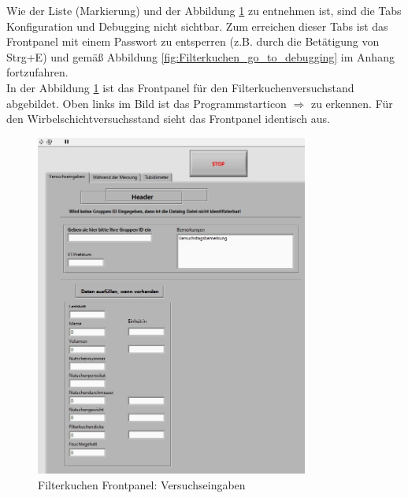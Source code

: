 Wie der Liste (\textcolor{black!50}{Markierung}) und der Abbildung \ref{fig:FilterkuchenVersuchseingaben} zu entnehmen ist, sind die Tabs \textcolor{black!50}{Konfiguration} und \textcolor{black!50}{Debugging} nicht sichtbar. Zum erreichen dieser Tabs ist das Frontpanel mit einem Passwort zu entsperren (z.B. durch die Betätigung von \,{\Menlo Strg+E}) und gemäß Abbildung \ref{fig:Filterkuchen_go_to_debugging} im Anhang fortzufahren. \\

In der Abbildung \ref{fig:FilterkuchenVersuchseingaben} ist das Frontpanel für den Filterkuchenversuchstand abgebildet. Oben links im Bild ist das Programmstarticon $\Rightarrow$ zu erkennen. Für den Wirbelschichtversuchsstand sieht das Frontpanel identisch aus.\\

\begin{figure}[h!] %
\centering
\includegraphics[width=0.8\textwidth]{Bilder/Filterkuchen_Appfotos/FK_Versuchseingaben.jpg}
\vspace{0em}
 \caption[Filterkuchen Frontpanel: Versuchseingaben]
{Filterkuchen Frontpanel: Versuchseingaben}\label{fig:FilterkuchenVersuchseingaben}
\end{figure}

